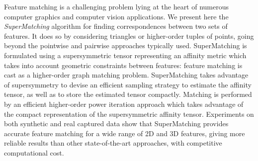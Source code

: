 Feature matching is a challenging problem lying at the heart of numerous computer graphics and computer vision applications.
We present here the \emph{SuperMatching} algorithm for finding correspondences between two sets of features.
It does so by considering triangles or higher-order tuples of points, going beyond the pointwise and pairwise approaches typically used.
SuperMatching is formulated using a supersymmetric tensor representing an affinity metric which takes into account geometric constraints between features:
feature matching is cast as a higher-order graph matching problem.
SuperMatching takes advantage of supersymmetry to devise an
efficient sampling strategy to estimate the affinity tensor, as well as to store the estimated tensor compactly.
Matching is performed by an efficient higher-order power iteration approach which takes advantage of the compact representation of the supersymmetric affinity tensor.
Experiments on both synthetic and real captured data show that
SuperMatching provides accurate feature matching for a wide range of 2D and 3D features,
giving more reliable results than other state-of-the-art approaches, with competitive computational cost. 